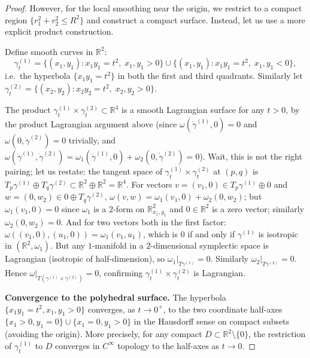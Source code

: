 \documentclass[12pt]{article}
\theoremstyle{definition}
\begin{document}
\begin{proof}
However, for the local smoothing near the origin, we restrict to a compact region $\{r_1^2+r_2^2 \leq R^2\}$ and construct a compact surface. Instead, let us use a more explicit product construction.

Define smooth curves in $\mathbb{R}^2$:
\begin{equation}
\label{eq:curves}
  \gamma_t^{(1)} = \{(x_1, y_1) : x_1 y_1 = t^2,\; x_1,y_1 > 0\} \cup \{(x_1,y_1): x_1 y_1 = t^2,\; x_1,y_1 < 0\},
\end{equation}
i.e.\ the hyperbola $\{x_1 y_1 = t^2\}$ in both the first and third quadrants. Similarly let $\gamma_t^{(2)} = \{(x_2,y_2): x_2 y_2 = t^2,\; x_2,y_2>0\}$.

The product $\gamma_t^{(1)} \times \gamma_t^{(2)} \subset \mathbb{R}^4$ is a smooth Lagrangian surface for any $t > 0$, by the product Lagrangian argument above (since $\omega(\dot\gamma^{(1)},0) = 0$ and $\omega(0,\dot\gamma^{(2)}) = 0$ trivially, and $\omega(\dot\gamma^{(1)}, \dot\gamma^{(2)}) = \omega_1(\dot\gamma^{(1)},0) + \omega_2(0,\dot\gamma^{(2)}) = 0$). Wait, this is not the right pairing; let us restate: the tangent space of $\gamma_t^{(1)} \times \gamma_t^{(2)}$ at $(p,q)$ is $T_p\gamma^{(1)} \oplus T_q\gamma^{(2)} \subset \mathbb{R}^2 \oplus \mathbb{R}^2 = \mathbb{R}^4$. For vectors $v = (v_1,0) \in T_p\gamma^{(1)}\oplus 0$ and $w=(0,w_2) \in 0\oplus T_q\gamma^{(2)}$, $\omega(v,w) = \omega_1(v_1,0) + \omega_2(0,w_2)$; but $\omega_1(v_1, 0) = 0$ since $\omega_1$ is a $2$-form on $\mathbb{R}^2_{x_1,y_1}$ and $0\in\mathbb{R}^2$ is a zero vector; similarly $\omega_2(0,w_2)=0$. And for two vectors both in the first factor: $\omega((v_1,0),(u_1,0)) = \omega_1(v_1,u_1)$, which is $0$ if and only if $\gamma^{(1)}$ is isotropic in $(\mathbb{R}^2,\omega_1)$. But any $1$-manifold in a $2$-dimensional symplectic space is Lagrangian (isotropic of half-dimension), so $\omega_1|_{T\gamma^{(1)}} = 0$. Similarly $\omega_2|_{T\gamma^{(2)}} = 0$. Hence $\omega|_{T(\gamma^{(1)}\times\gamma^{(2)})} = 0$, confirming $\gamma_t^{(1)}\times\gamma_t^{(2)}$ is Lagrangian.

\medskip
\noindent\textbf{Convergence to the polyhedral surface.} The hyperbola $\{x_1 y_1 = t^2, x_1,y_1>0\}$ converges, as $t\to 0^+$, to the two coordinate half-axes $\{x_1>0,y_1=0\}\cup\{x_1=0,y_1>0\}$ in the Hausdorff sense on compact subsets (avoiding the origin). More precisely, for any compact $D \subset \mathbb{R}^2\setminus\{0\}$, the restriction of $\gamma_t^{(1)}$ to $D$ converges in $C^\infty$ topology to the half-axes as $t\to 0$.


\end{proof}
\end{document}
